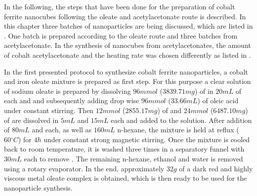 \documentclass[\main/dresen_thesis.tex]{subfiles}
\begin{document}
  \label{sec:monolayers:nanoparticle:synthesisOleatesAcAc}
  In the following, the steps that have been done for the preparation of cobalt ferrite nanocubes following the oleate and acetylacetonate route is described.
  In this chapter three batches of nanoparticles are being discussed, which are listed in .
  One batch is prepared according to the oleate route and three batches from acetylacetonate.
  In the synthesis of nanocubes from acetylacetonates, the amount of cobalt acetylacetonate and the heating rate was chosen differently as listed in .

    In the first presented protocol to synthesize cobalt ferrite nanoparticles, a cobalt and iron oleate mixture is prepared as first step.
    For this purpose a clear solution of sodium oleate is prepared by dissolving $96 \unit{mmol}$ ($3839.71 \unit{mg}$) of  in $20 \unit{mL}$ of each  and  and subsequently adding drop wise $96 \unit{mmol}$ ($33.66 \unit{mL}$) of oleic acid under constant stirring.
    Then $12 \unit{mmol}$ ($2855.17 \unit{mg}$) of  and $24 \unit{mmol}$ ($6487.10 \unit{mg}$) of  are dissolved in $5 \unit{mL}$  and $15 \unit{mL}$  each and added to the solution.
    After addition of $80 \unit{mL}$  and  each, as well as $160 \unit{mL}$ n-hexane, the mixture is held at reflux ($60 \unit{^\circ C}$) for $4 \unit{h}$ under constant strong magnetic stirring.
    Once the mixture is cooled back to room temperature, it is washed three times in a separatory funnel with $30 \unit{mL}$  each to remove .
    The remaining n-hexane, ethanol and water is removed using a rotary evaporator.
    In the end, approximately $32 \unit{g}$ of a dark red and highly viscous metal oleate complex is obtained, which is then ready to be used for the nanoparticle synthesis.
\end{document}
